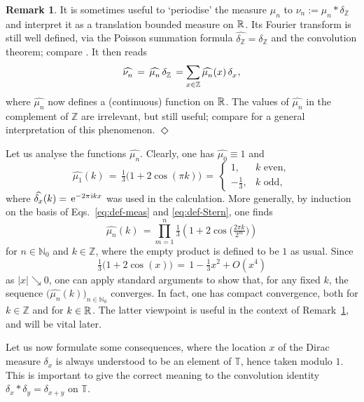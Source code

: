 \documentclass[11pt,a4paper]{amsart}
\theoremstyle{plain}
\theoremstyle{definition}
\newtheorem{remark}[theorem]{Remark}
\numberwithin{equation}{section}
\newcommand{\ii}{\ts\mathrm{i}}
\newcommand{\ee}{\,\mathrm{e}}
\newcommand{\ts}{\hspace{0.5pt}}
\newcommand{\ZZ}{\mathbb{Z}}
\newcommand{\RR}{\mathbb{R}\ts}
\newcommand{\NN}{\mathbb{N}}
\newcommand{\TT}{\mathbb{T}}
\newcommand{\exend}{\hfill $\Diamond$}
\begin{document}
\begin{remark}\label{rem:period}
  It is sometimes useful to `periodise' the measure $\mu^{}_{n}$
  to $\nu^{}_{n} := \mu^{}_{n} * \delta^{}_{\ZZ}$ and interpret it
  as a translation bounded measure on $\RR$. Its Fourier transform
  is still well defined, via the Poisson summation formula
  $\widehat{\delta^{}_{\ZZ}} = \delta^{}_{\ZZ}$ and the convolution
  theorem; compare \cite[Prop.~8.5 and Sec.~9.2]{TAO}. It then reads
\[
    \widehat{\nu^{}_{n}} \, = \,  \widehat{\mu^{}_n}
    \, \delta^{}_{\ZZ} \, = \sum_{x\in\ZZ}
    \widehat{\mu^{}_n} (x) \, \delta^{}_{x} \ts ,
\]
where $ \widehat{\mu^{}_n}$ now defines a (continuous) function on
$\RR$. The values of $\widehat{\mu^{}_n}$ in the complement
of $\ZZ$ are irrelevant, but still useful; compare
\cite[Sec.~9.2.4]{TAO} for a general interpretation of this
phenomenon.  \exend
\end{remark}

Let us analyse the functions $\widehat{\mu^{}_n}$.
Clearly, one has $\widehat{\mu^{}_{0}}\equiv 1$ and 
\[
    \widehat{\mu^{}_1} (k) \, = \,
    \tfrac{1}{3} \bigl( 1 + 2 \cos (\pi k) \bigr)
    \, = \, \begin{cases} 1, & \text{$k$ even}, \\
         - \frac{1}{3}, & \text{$k$ odd},
    \end{cases}
\]
where $\widehat{\delta_x} (k) = \ee^{-2 \pi \ii kx}$ was used in the
calculation.  More generally, by induction on the basis of
Eqs.~\eqref{eq:def-meas} and \eqref{eq:def-Stern}, one finds
\begin{equation}\label{eq:fin-prod}
    \widehat{\mu^{}_{n}} (k) \, = \prod_{m=1}^{n}
    \tfrac{1}{3} \! \left( 1 + 2 \cos \bigl(
    \tfrac{2 \pi k}{2^m} \bigr) \right)
\end{equation}
for $n\in\NN_0$ and $k\in\ZZ$, where the empty product is defined to
be $1$ as usual. Since
\[
    \tfrac{1}{3} \bigl( 1 + 2 \cos (x) \bigr)
    \, = \, 1 - \tfrac{1}{3} x^2 + O(x^4)
\]
as $\lvert x \rvert \searrow 0$, one can apply standard arguments to
show that, for any fixed $k$, the sequence
$\bigl( \widehat{\mu^{}_n} (k) \bigr)_{n\in\NN_0}$ converges. In fact,
one has compact convergence, both for $k\in\ZZ$ and for $k\in\RR$.
The latter viewpoint is useful in the context of
Remark~\ref{rem:period}, and will be vital later.

Let us now formulate some consequences, where the location
$x$ of the Dirac measure $\delta_x$ is always understood to be an
element of $\TT$, hence taken modulo $1$. This is important to
give the correct meaning to the convolution identity $\delta_x * 
\delta_y =\delta_{x+y}$ on $\TT$.
\end{document}
